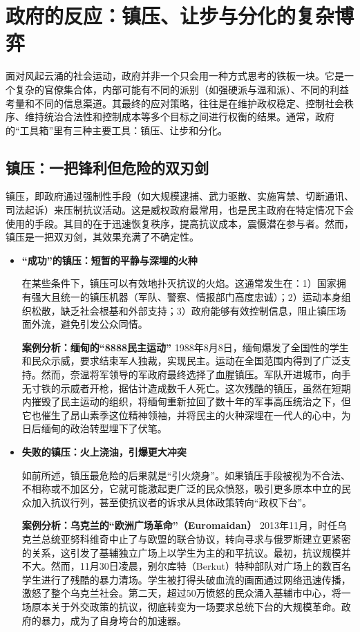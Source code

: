 \section{ 政府的反应：镇压、让步与分化的复杂博弈}

面对风起云涌的社会运动，政府并非一个只会用一种方式思考的铁板一块。它是一个复杂的官僚集合体，内部可能有不同的派别（如强硬派与温和派）、不同的利益考量和不同的信息渠道。其最终的应对策略，往往是在维护政权稳定、控制社会秩序、维持统治合法性和控制成本等多个目标之间进行权衡的结果。通常，政府的“工具箱”里有三种主要工具：镇压、让步和分化。

\subsection{镇压：一把锋利但危险的双刃剑}

镇压，即政府通过强制性手段（如大规模逮捕、武力驱散、实施宵禁、切断通讯、司法起诉）来压制抗议活动。这是威权政府最常用，也是民主政府在特定情况下会使用的手段。其目的在于迅速恢复秩序，提高抗议成本，震慑潜在参与者。然而，镇压是一把双刃剑，其效果充满了不确定性。

\begin{itemize}
    \item \textbf{“成功”的镇压：短暂的平静与深埋的火种}

    在某些条件下，镇压可以有效地扑灭抗议的火焰。这通常发生在：1）国家拥有强大且统一的镇压机器（军队、警察、情报部门高度忠诚）；2）运动本身组织松散，缺乏社会根基和外部支持；3）政府能够有效控制信息，阻止镇压场面外流，避免引发公众同情。

    \textbf{案例分析：缅甸的“8888民主运动”}
    1988年8月8日，缅甸爆发了全国性的学生和民众示威，要求结束军人独裁，实现民主。运动在全国范围内得到了广泛支持。然而，奈温将军领导的军政府最终选择了血腥镇压。军队开进城市，向手无寸铁的示威者开枪，据估计造成数千人死亡。这次残酷的镇压，虽然在短期内摧毁了民主运动的组织，将缅甸重新拉回了数十年的军事高压统治之下，但它也催生了昂山素季这位精神领袖，并将民主的火种深埋在一代人的心中，为日后缅甸的政治转型埋下了伏笔。

    \item \textbf{失败的镇压：火上浇油，引爆更大冲突}

    如前所述，镇压最危险的后果就是“引火烧身”。如果镇压手段被视为不合法、不相称或不加区分，它就可能激起更广泛的民众愤怒，吸引更多原本中立的民众加入抗议行列，甚至使抗议者的诉求从具体政策转向“政权下台”。

    \textbf{案例分析：乌克兰的“欧洲广场革命”（Euromaidan）}
    2013年11月，时任乌克兰总统亚努科维奇中止了与欧盟的联合协议，转向寻求与俄罗斯建立更紧密的关系，这引发了基辅独立广场上以学生为主的和平抗议。最初，抗议规模并不大。然而，11月30日凌晨，别尔库特（Berkut）特种部队对广场上的数百名学生进行了残酷的暴力清场。学生被打得头破血流的画面通过网络迅速传播，激怒了整个乌克兰社会。第二天，超过50万愤怒的民众涌入基辅市中心，将一场原本关于外交政策的抗议，彻底转变为一场要求总统下台的大规模革命。政府的暴力，成为了自身垮台的加速器。
\end{itemize}

